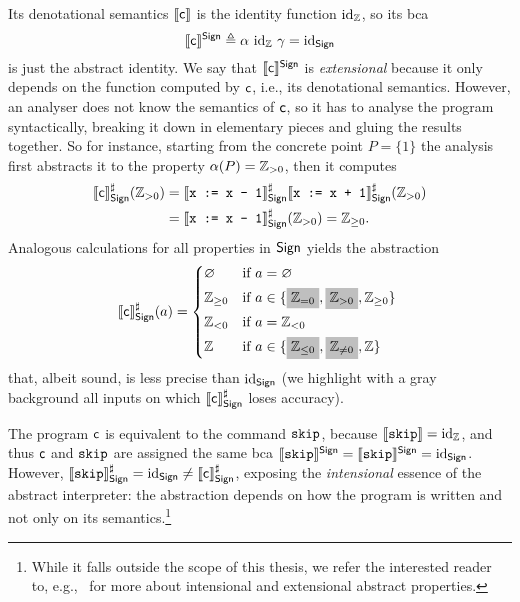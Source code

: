 \begin{example}
	Its denotational semantics $\llbracket\mathsf{c}\rrbracket$ is the identity function $\text{id}_{\mathbb{Z}}$, so its bca $$\llbracket\mathsf{c}\rrbracket^{\mathsf{Sign}} \triangleq \alpha~\text{id}_{\mathbb{Z}}~\gamma = \text{id}_{\mathsf{Sign}}$$
	is just the abstract identity. We say that $\llbracket\mathsf{c}\rrbracket^{\mathsf{Sign}}$ is \emph{extensional} because it only depends on the function computed by $\mathsf{c}$, i.e., its denotational semantics. However, an analyser does not know the semantics of $\mathsf{c}$, so it has to analyse the program syntactically, breaking it down in elementary pieces and gluing the results together. So for instance, starting from the concrete point $P = \{ 1 \}$ the analysis first abstracts it to the property $\alpha(P) = \mathbb{Z}_{> 0}$, then it computes
	\begin{align*}
		\llbracket\mathsf{c}\rrbracket^{\sharp}_{\mathsf{Sign}} (\mathbb{Z}_{> 0}) &= \llbracket\texttt{x := x - 1}\rrbracket^{\sharp}_{\mathsf{Sign}} \llbracket\texttt{x := x + 1}\rrbracket^{\sharp}_{\mathsf{Sign}} (\mathbb{Z}_{> 0}) \\
		&= \llbracket\texttt{x := x - 1}\rrbracket^{\sharp}_{\mathsf{Sign}} (\mathbb{Z}_{> 0}) = \mathbb{Z}_{\ge 0} .
	\end{align*}
	Analogous calculations for all properties in $\mathsf{Sign}$ yields the abstraction
	\[
	\denot{\regc}^{\sharp}_{\Sign}(a) = \begin{cases*}
		\varnothing & if $a = \varnothing$ \\
		\setZ_{\ge 0} & if $a \in \{ \colorbox{lightgray}{$\setZ_{= 0}$}, \colorbox{lightgray}{$\setZ_{> 0}$}, \setZ_{\ge 0} \}$ \\
		\setZ_{< 0} & if $a = \setZ_{< 0}$ \\
		\setZ & if $a \in \{ \colorbox{lightgray}{$\setZ_{\le 0}$}, \colorbox{lightgray}{$\setZ_{\neq 0}$}, \setZ \}$ 
	\end{cases*}
	\]
	that, albeit sound, is less precise than $\text{id}_{\mathsf{Sign}}$ (we highlight with a gray background all inputs on which $\llbracket\mathsf{c}\rrbracket^{\sharp}_{\mathsf{Sign}}$ loses accuracy). 
	
	The program $\mathsf{c}$ is equivalent to the command $\texttt{skip}$, because $\llbracket\texttt{skip}\rrbracket=\text{id}_{\mathbb{Z}}$, and thus $\mathsf{c}$ and $\texttt{skip}$ are assigned the same bca $\llbracket\texttt{skip}\rrbracket^{\mathsf{Sign}} = \llbracket\texttt{skip}\rrbracket^{\mathsf{Sign}} =  \text{id}_{\mathsf{Sign}}$.
	However, $\llbracket\texttt{skip}\rrbracket^{\sharp}_{\mathsf{Sign}} = \text{id}_{\mathsf{Sign}} \neq \llbracket\mathsf{c}\rrbracket^{\sharp}_{\mathsf{Sign}}$, exposing the \emph{intensional} essence of the abstract interpreter: the abstraction depends on how the program is written and not only on its semantics.\footnote{While it falls outside the scope of this thesis, we refer the interested reader to, e.g.,~\cite{BGGGP19,BRZ22} for more about intensional and extensional abstract properties.}
\end{example}

